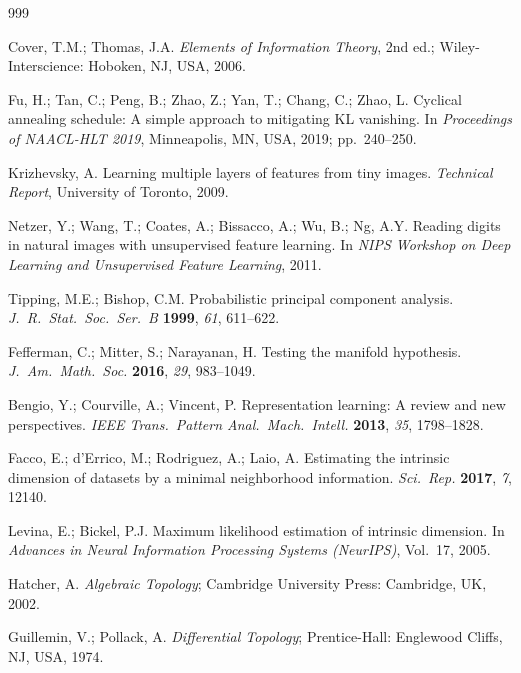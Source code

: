 \documentclass[make,article,submit,pdftex,moreauthors]{Definitions/mdpi}
\begin{document}
\begin{thebibliography}{999}

Cover, T.M.; Thomas, J.A.
\textit{Elements of Information Theory}, 2nd ed.;
Wiley-Interscience: Hoboken, NJ, USA, 2006.

Fu, H.; Tan, C.; Peng, B.; Zhao, Z.; Yan, T.; Chang, C.; Zhao, L.
Cyclical annealing schedule: A simple approach to mitigating {KL} vanishing.
In \textit{Proceedings of NAACL-HLT 2019}, Minneapolis, MN, USA, 2019;
pp.~240--250.

Krizhevsky, A.
Learning multiple layers of features from tiny images.
\textit{Technical Report}, University of Toronto, 2009.

Netzer, Y.; Wang, T.; Coates, A.; Bissacco, A.; Wu, B.; Ng, A.Y.
Reading digits in natural images with unsupervised feature learning.
In \textit{NIPS Workshop on Deep Learning and Unsupervised Feature Learning},
2011.

Tipping, M.E.; Bishop, C.M.
Probabilistic principal component analysis.
\textit{J.\ R.\ Stat.\ Soc.\ Ser.\ B} \textbf{1999}, \textit{61}, 611--622.

Fefferman, C.; Mitter, S.; Narayanan, H.
Testing the manifold hypothesis.
\textit{J.\ Am.\ Math.\ Soc.} \textbf{2016}, \textit{29}, 983--1049.

Bengio, Y.; Courville, A.; Vincent, P.
Representation learning: A review and new perspectives.
\textit{IEEE Trans.\ Pattern Anal.\ Mach.\ Intell.} \textbf{2013},
\textit{35}, 1798--1828.

Facco, E.; d'Errico, M.; Rodriguez, A.; Laio, A.
Estimating the intrinsic dimension of datasets by a minimal neighborhood
information.
\textit{Sci.\ Rep.} \textbf{2017}, \textit{7}, 12140.

Levina, E.; Bickel, P.J.
Maximum likelihood estimation of intrinsic dimension.
In \textit{Advances in Neural Information Processing Systems (NeurIPS)},
Vol.~17, 2005.

Hatcher, A.
\textit{Algebraic Topology};
Cambridge University Press: Cambridge, UK, 2002.

Guillemin, V.; Pollack, A.
\textit{Differential Topology};
Prentice-Hall: Englewood Cliffs, NJ, USA, 1974.


\end{thebibliography}
\end{document}
